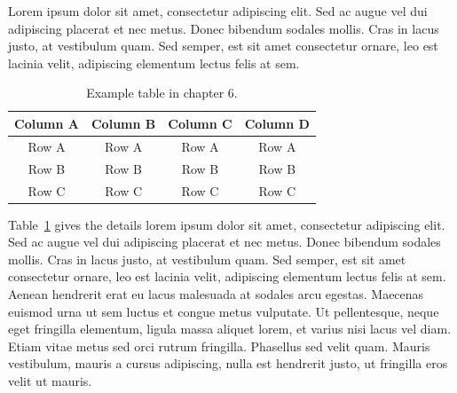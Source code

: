Lorem ipsum dolor sit amet, consectetur adipiscing elit. Sed ac augue vel dui 
adipiscing placerat et nec metus. Donec bibendum sodales mollis. Cras in lacus 
justo, at vestibulum quam. Sed semper, est sit amet consectetur ornare, leo est 
lacinia velit, adipiscing elementum lectus felis at sem.

\begin{table}[!ht]
{\setlength{\tabcolsep}{14pt}
\caption{Example table in chapter 6.}
\begin{center}
\vspace{-6mm}
\begin{tabular}{cccc}
\hline\hline
Column A & Column B & Column C & Column D \\
\hline
Row A & Row A & Row A & Row A \\
Row B & Row B & Row B & Row B \\
Row C & Row C & Row C & Row C \\
\hline
\end{tabular}
\vspace{-6mm}
\end{center}
\label{tableforCh6-1}}
\end{table}

Table~\ref{tableforCh6-1} gives the details lorem ipsum dolor sit amet, consectetur adipiscing elit. Sed ac augue vel dui 
adipiscing placerat et nec metus. Donec bibendum sodales mollis. Cras in lacus 
justo, at vestibulum quam. Sed semper, est sit amet consectetur ornare, leo est 
lacinia velit, adipiscing elementum lectus felis at sem. Aenean hendrerit erat eu 
lacus malesuada at sodales arcu egestas. Maecenas euismod urna ut sem luctus et 
congue metus vulputate. Ut pellentesque, neque eget fringilla elementum, ligula 
massa aliquet lorem, et varius nisi lacus vel diam. Etiam vitae metus sed orci 
rutrum fringilla. Phasellus sed velit quam. Mauris vestibulum, mauris a cursus 
adipiscing, nulla est hendrerit justo, ut fringilla eros velit ut mauris.